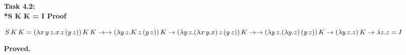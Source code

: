 \documentclass[12pt]{article}
\begin{document}
	
	\Large 
	\begin{center}
		\textbf{Task 4.2:\\*S K K = I Proof}
	\end{center}

	$\\*S\,K\,K = (\lambda x\,y\,z. x \, z \, (y \, z)) \, K \, K \to
	 \\* \to (\lambda y\,z.K\,z\,(y\,z))\,K
	 \\* \to (\lambda y\,z.(\lambda x\,y.x)\,z\,(y\,z))\,K \to
	 \\* \to (\lambda y\,z.(\lambda y.z)\,(y\,z))\,K
	 \\* \to (\lambda y\,z.z)\,K
	 \\* \to \lambda z.z = I$
	
	\begin{flushleft}
		\textbf{Proved.}
	\end{flushleft}
	
\end{document}
